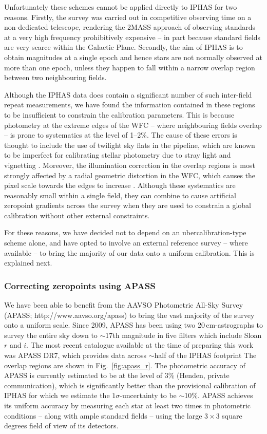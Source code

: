 \documentclass[useAMS,usenatbib]{mn2e}
\begin{document}
Unfortunately these schemes cannot be applied
directly to IPHAS
for two reasons. 
Firstly, the survey was carried out 
in competitive observing time
on a non-dedicated telescope, 
rendering the 2MASS approach 
of observing standards at a very high frequency
prohibitively expensive
-- in part because standard fields 
are very scarce within the Galactic Plane.
Secondly, the aim of IPHAS is to obtain magnitudes at a single epoch
and hence stars are not normally observed at more than one epoch,
unless they happen to fall within a narrow overlap region 
between two neighbouring fields.

Although the IPHAS data does contain a significant number of 
such inter-field repeat measurements,
we have found the information contained
in these regions to be insufficient
to constrain the calibration parameters.
This is because photometry at the extreme edges of the WFC
-- where neighbouring fields overlap -- 
is prone to systematics at the level of 1--2\%.
The cause of these errors is thought to include 
the use of twilight sky flats in the pipeline,
which are known to be imperfect for calibrating stellar photometry 
due to stray light and vignetting \citep[e.g.][]{Manfroid1995}.
Moreover, the illumination correction in the overlap regions
is most strongly affected by a radial geometric distortion in the WFC,
which causes the pixel scale towards the edges 
to increase \citep{Gonzalez-Solares2011}.
Although these systematics are reasonably small within a single field,
they can combine to cause artificial zeropoint gradients 
across the survey
when they are used to constrain a global calibration
without other external constraints.

For these reasons, we have decided not to depend
on an ubercalibration-type scheme alone,
and have opted to involve an external reference survey
-- where available --
to bring the majority of our data onto a uniform calibration.
This is explained next.

\subsubsection{Correcting zeropoints using APASS}

We have been able to benefit from the
AAVSO Photometric All-Sky Survey
(APASS; http://www.aavso.org/apass)
to bring the vast majority of the survey 
onto a uniform scale.
Since 2009,
APASS has been using two 20\,cm-astrographs
to survey the entire sky down to $\sim$17th magnitude
in five filters which include Sloan $r$ and $i$.
The most recent catalogue available 
at the time of preparing this work was APASS DR7,
which provides data across $\sim$half of the IPHAS footprint
The overlap regions are shown in Fig.~\ref{fig:apass_r}.
The photometric accuracy of APASS is currently estimated 
to be at the level of 3\% (Henden, private communication),
which is significantly better 
than the provisional calibration of IPHAS
for which we estimate the $1\sigma$-uncertainty to be $\sim$10\%.
APASS achieves its uniform accuracy 
by measuring each star at least two times in photometric conditions
-- along with ample standard fields --
using the large $3\times3$ square degrees field of view of its detectors.
\end{document}
